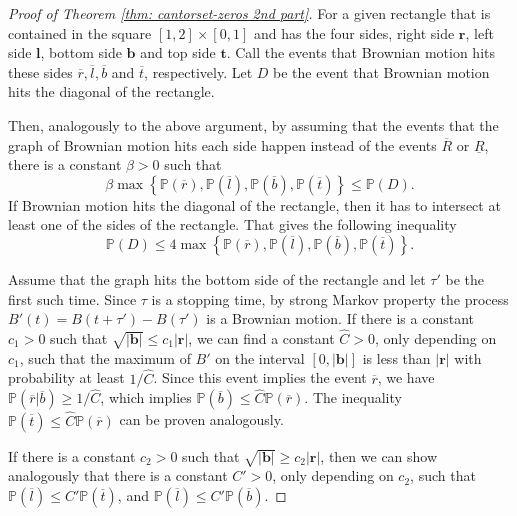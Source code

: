 \documentclass[11pt,reqno]{amsart}
\theoremstyle{plain}
\theoremstyle{definition}
\theoremstyle{remark}
\begin{document}
\begin{proof}[Proof of Theorem \ref{thm: cantorset-zeros 2nd part}]
For a given rectangle that is contained in the square $[1,2]\times [0,1]$ and has the four sides, right side $\textbf{r}$, left side $\textbf{l}$, bottom side $\textbf{b}$ and top side $\textbf{t}$. Call the events that Brownian motion hits these sides $\overline{r},\overline{l},\overline{b}$ and $\overline{t}$, respectively. Let $D$ be the event that Brownian motion hits the diagonal of the rectangle.

Then, analogously to the above argument, by assuming that the events that the graph of Brownian motion hits each side happen instead of the events $\overline{R}$ or $\underline{R}$,
there is a constant $\beta>0$ such that
\begin{equation}\label{eq: approximation of probabilities_3}
\beta \max \left\lbrace \mathbb{P}(\overline{r}), \mathbb{P}(\overline{l}), \mathbb{P}(\overline{b}), \mathbb{P}(\overline{t}) \right\rbrace \leq \mathbb{P}(D).
\end{equation}
If Brownian motion hits the diagonal of the rectangle, then it has to intersect at least one of the sides of the rectangle. That gives the following inequality
\begin{equation}\label{eq: approximation of probabilities_4}
\mathbb{P}(D) \leq 4\max \left\lbrace \mathbb{P}(\overline{r}), \mathbb{P}(\overline{l}), \mathbb{P}(\overline{b}), \mathbb{P}(\overline{t}) \right\rbrace.
\end{equation}

Assume that the graph hits the bottom side of the rectangle and let $\tau'$ be the first such time. Since $\tau$ is a stopping time, by strong Markov property the process $B'(t)=B(t+\tau')-B(\tau')$ is a Brownian motion. If there is a constant $c_1>0$ such that $\sqrt{|\textbf{b}|} \leq c_1|\textbf{r}|$, we can find a constant $\hat{C}>0$, only depending on $c_1$, such that the maximum of $B'$ on the interval $[0,|\textbf{b}|]$ is less than $|\textbf{r}|$ with probability at least $1/\hat{C}$. Since this event implies the event $\overline{r}$, we have $\mathbb{P}(\overline{r}|\overline{b}) \geq 1/\hat{C}$, which implies $\mathbb{P}(\overline{b})\leq \hat{C}\mathbb{P}(\overline{r})$. The inequality $\mathbb{P}(\overline{t})\leq \hat{C}\mathbb{P}(\overline{r})$ can be proven analogously.

If there is a constant $c_2>0$ such that $\sqrt{|\textbf{b}|} \geq c_2 |\textbf{r}|$, then we can show analogously that there is a constant $C'>0$, only depending on $c_2$, such that $\mathbb{P}(\overline{l})\leq C'\mathbb{P}(\overline{t})$, and $\mathbb{P}(\overline{l})\leq C'\mathbb{P}(\overline{b})$.


\end{proof}
\end{document}
